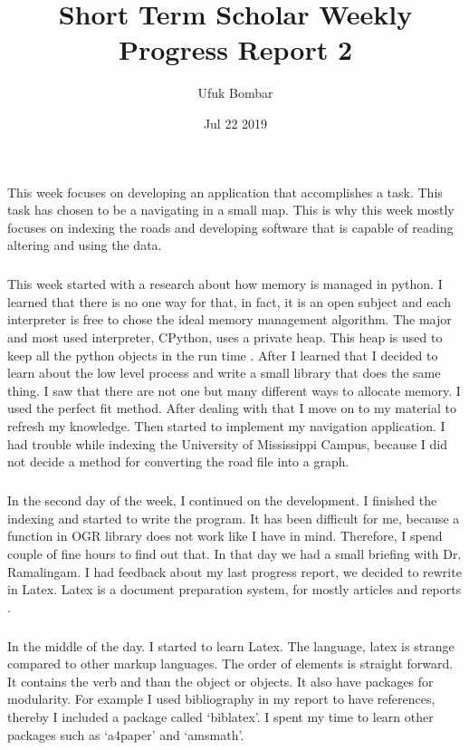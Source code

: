 \documentclass{article}
\title{Short Term Scholar Weekly Progress Report 2}
\author{Ufuk Bombar}
\date{Jul 22 2019}
\begin{document}
\maketitle

\subparagraph{}
This week focuses on developing an application that accomplishes a task. This task has chosen to be a navigating in a small map. This is why this week mostly focuses on indexing the roads and developing software that is capable of reading altering and using the data.

\subparagraph{}
This week started with a research about how memory is managed in python. I learned that there is no one way for that, in fact, it is an open subject and each interpreter is free to chose the ideal memory management algorithm. The major and most used interpreter, CPython, uses a private heap. This heap is used to keep all the python objects in the run time \cite{cpython}. After I learned that I decided to learn about the low level process and write a small library that does the same thing. I saw that there are not one but many different ways to allocate memory. I used the perfect fit method. After dealing with that I move on to my material to refresh my knowledge. Then started to implement my navigation application. I had trouble while indexing the University of Mississippi Campus, because I did not decide a method for converting the road file into a graph.

\subparagraph{}
In the second day of the week, I continued on the development. I finished the indexing and started to write the program. It has been difficult for me, because a function in OGR library does not work like I have in mind. Therefore, I spend couple of fine hours to find out that. In that day we had a small briefing with Dr. Ramalingam. I had feedback about my last progress report, we decided to rewrite in Latex. Latex is a document preparation system, for mostly articles and reports \cite{latex}. 

\subparagraph{}
In the middle of the day. I started to learn Latex. The language, latex is strange compared to other markup languages. The order of elements is straight forward. It contains the verb and than the object or objects. It also have packages for modularity. For example I used bibliography in my report to have references, thereby I included a package called ‘biblatex’. I spent my time to learn other packages such as ‘a4paper’ and ‘amsmath’.
\end{document}
